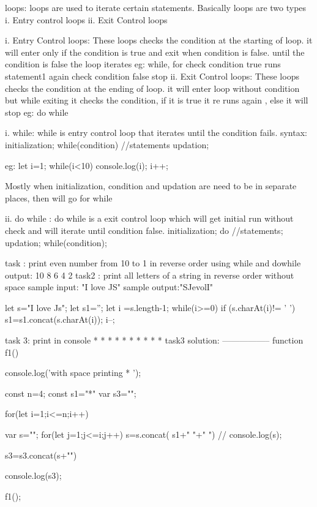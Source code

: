 
loops: loops are used to iterate certain statements. Basically loops are two types
  i. Entry control loops
  ii. Exit Control loops

i. Entry Control loops:
    These loops checks the condition at the starting of loop. it will enter only if the condition is true and exit when condition is false. until the condition is false the loop iterates
    eg: while, for
      check condition
         true
           runs statement1
           again check condition
     false
         stop
ii. Exit Control loops:
    These loops checks the condition at the ending of loop. it will enter loop without condition but while exiting it checks the condition, if it is true it re runs again , else it will stop
   eg: do while

   i. while: while is entry control loop that iterates until the condition fails.
    syntax: initialization;
            while(condition){
                //statements
                updation;
            }

      eg: let i=1;
      while(i<10){
        console.log(i);
        i++;
      }

    Mostly when initialization, condition and updation are need to be in separate places, then will go for while

ii. do while : do while is a exit control loop which will get initial run without check and will iterate until condition false.
     initialization;
      do{
        //statements;
        updation;
      }while(condition);

    task : print even number from 10 to 1 in reverse order using while and dowhile
    output: 10
            8
            6
            4
            2
    task2 : print all letters of a string in reverse order without space
    sample input: "I love JS"
    sample output:"SJevolI"

let s="I love Js";
let s1='';
let i =s.length-1;
while(i>=0){
if (s.charAt(i)!= ' ')
{
s1=s1.concat(s.charAt(i));
}
i--;
}

task 3:
print in console
*
* *
* * *
* * * *
task3 solution:
-----------------
function f1(){
    console.log('with space printing * ');

    const n=4;
    const s1="*"
    var s3="";

    for(let i=1;i<=n;i++)
         {
            var s="";
            for(let j=1;j<=i;j++)
            {
                s=s.concat( s1+" "+" ")
            }
           // console.log(s);
           
            s3=s3.concat(s+"\n")
            
         }
         console.log(s3);
}
f1();

